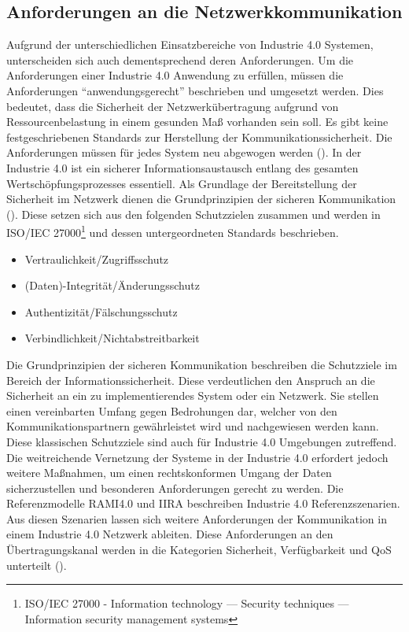 \subsection{Anforderungen an die Netzwerkkommunikation}
\label{Grundlagen:Anforderungen}
Aufgrund der unterschiedlichen Einsatzbereiche von Industrie 4.0 Systemen, unterscheiden sich auch dementsprechend deren Anforderungen. Um die Anforderungen einer Industrie 4.0 Anwendung zu erfüllen, müssen die Anforderungen "`anwendungsgerecht"' beschrieben und umgesetzt werden. Dies bedeutet, dass die Sicherheit der Netzwerkübertragung aufgrund von Ressourcenbelastung in einem gesunden Maß vorhanden sein soll. Es gibt keine festgeschriebenen Standards zur Herstellung der Kommunikationssicherheit. Die Anforderungen müssen für jedes System neu abgewogen werden (\cite{BMWiSuK2016}). In der Industrie 4.0 ist ein sicherer Informationsaustausch entlang des gesamten Wertschöpfungsprozesses essentiell. Als Grundlage der Bereitstellung der Sicherheit im Netzwerk dienen die Grundprinzipien der sicheren Kommunikation (\cite{Schleupner2016}). Diese setzen sich aus den folgenden Schutzzielen zusammen und werden in \ac{ISO}/\ac{IEC} 27000\footnote{ISO/IEC 27000 - Information technology — Security techniques — Information security management systems} und dessen untergeordneten Standards beschrieben.

\begin{itemize}
  \item Vertraulichkeit/Zugriffsschutz
  \item (Daten)-Integrität/Änderungsschutz
  \item Authentizität/Fälschungsschutz
  \item Verbindlichkeit/Nichtabstreitbarkeit
\end{itemize}

Die Grundprinzipien der sicheren Kommunikation beschreiben die Schutzziele im Bereich der Informationssicherheit. Diese verdeutlichen den Anspruch an die Sicherheit an ein zu implementierendes System oder ein Netzwerk. Sie stellen einen vereinbarten Umfang gegen Bedrohungen dar, welcher von den Kommunikationspartnern gewährleistet wird und nachgewiesen werden kann. Diese klassischen Schutzziele sind auch für Industrie 4.0 Umgebungen zutreffend. Die weitreichende Vernetzung der Systeme in der Industrie 4.0 erfordert jedoch weitere Maßnahmen, um einen rechtskonformen Umgang der Daten sicherzustellen und besonderen Anforderungen gerecht zu werden. Die Referenzmodelle \ac{RAMI4.0} und \ac{IIRA} beschreiben Industrie 4.0 Referenzszenarien. Aus diesen Szenarien lassen sich weitere Anforderungen der Kommunikation in einem Industrie 4.0 Netzwerk ableiten. Diese Anforderungen an den Übertragungskanal werden in die Kategorien Sicherheit, Verfügbarkeit und \ac{QoS} unterteilt (\cite{BMWiNeCon2016}).

